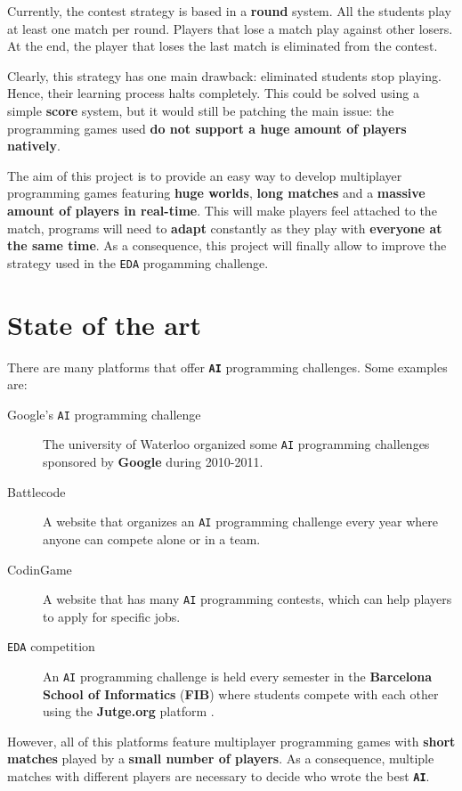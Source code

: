 \documentclass[a4paper,11pt,titlepage,abstract,numbers=noenddot,automark,mnsy,intlimits,rgb,dvipsnames]{report}
\begin{document}
Currently, the contest strategy is based in a \textbf{round} system. All the students play at least one match per round. Players
that lose a match play against other losers. At the end, the player that loses the last match is eliminated from the contest.

Clearly, this strategy has one main drawback: eliminated students stop playing. Hence, their learning process halts completely.
This could be solved using a simple \textbf{score} system, but it would still be patching the main issue: the
programming games used \textbf{do not support a huge amount of players natively}.

The aim of this project is to provide an easy way to develop multiplayer programming games featuring \textbf{huge worlds},
\textbf{long matches} and a \textbf{massive amount of players in real-time}. This will make players feel attached to the match,
programs will need to \textbf{adapt} constantly as they play with \textbf{everyone at the same time}. As a consequence, this project will
finally allow to improve the strategy used in the \texttt{EDA} progamming challenge.
\section{State of the art}
\label{state_of_the_art}
There are many platforms that offer \textbf{\texttt{AI}} programming challenges. Some examples are:
\begin{description}
\item[Google's \texttt{AI} programming challenge \cite{google_ai}]
The university of Waterloo organized some \texttt{AI} programming challenges
  sponsored by \textbf{Google} during 2010-2011.
\item[Battlecode \cite{battlecode}]
A website that organizes an \texttt{AI} programming challenge every year where anyone can
  compete alone or in a team.
\item[CodinGame \cite{codingame}]
A website that has many \texttt{AI} programming contests, which can help players to apply for
  specific jobs.
\item[\texttt{EDA} competition \cite{eda}]
An \texttt{AI} programming challenge is held every semester in the \textbf{Barcelona School of
  Informatics} (\textbf{FIB}) where students compete with each other using the \textbf{Jutge.org} platform \cite{jutge}.
\end{description}
However, all of this platforms feature multiplayer programming games with \textbf{short matches} played by a
\textbf{small number of players}. As a consequence, multiple matches with different players are necessary to decide who wrote
the best \textbf{\texttt{AI}}.
\end{document}
